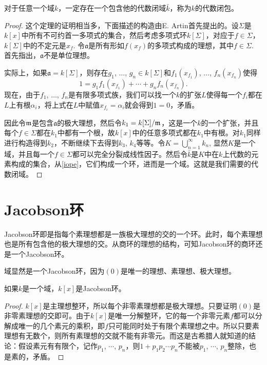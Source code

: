 \begin{thm}
对于任意一个域$k$，一定存在一个包含他的代数闭域$\bar{k}$，称为$k$的代数闭包。
\end{thm}

\begin{proof}
	这个定理的证明相当多，下面描述的构造由E. Artin首先提出的。设$\Sigma$是$k[x]$中所有不可约首一多项式的集合，然后考虑多项式环$k[\Sigma]$，对应于$f\in\Sigma$，$k[\Sigma]$中的不定元是$x_f$. 令$\mathfrak{a}$是所有形如$f(x_f)$的多项式构成的理想，其中$f\in\Sigma$. 首先指出，$\mathfrak{a}$不是单位理想。

	实际上，如果$\mathfrak{a}=k[\Sigma]$，则存在$g_1$, $\dots$, $g_n\in k[\Sigma]$和$f_1(x_{f_1})$, $\dots$, $f_n(x_{f_n})$使得
	\[
	1=g_1f_1(x_{f_1})+\cdots +g_nf_n(x_{f_n}).
	\]
	现在，由于$f_1$, $\dots$, $f_n$是有限多项式族，我们可以找一个$k$的扩张$L$使得每一个$f_i$都在$L$上有根$\alpha_i$，将上式在$L$中赋值$x_{f_i}=\alpha_i$就会得到$1=0$，矛盾。

	因此令$\mathfrak{m}$是包含$\mathfrak{a}$的极大理想，然后令$k_1=k[\Sigma]/\mathfrak{m}$，这是一个$k$的一个扩张，并且每个$f\in \Sigma$都在$k_1$中都有一个根，故$k[x]$中的任意多项式都在$k_1$中有根。对$k_1$同样进行构造得到$k_2$，不断继续下去得到$k_3$, $k_4$等等。令$K=\bigcup_{n=1}^\infty k_n$, 显然$K$是一个域，并且每一个$f\in \Sigma$都可以完全分裂成线性因子。然后令$\bar{k}$是$K$中在$k$上代数的元素构成的集合，从\ref{iope}，它们构成一个环，进而是一个域。这就是我们需要的代数闭域。
\end{proof}

\section{Jacobson环}

\begin{para}[Jacobson环]
	Jacobson环即是指每个素理想都是一族极大理想的交的一个环。此时，每个素理想也是所有包含他的极大理想的交。从商环的理想的结构，可知Jacobson环的商环还是一个Jacobson环。
\end{para}

域显然是一个Jacobson环，因为$(0)$是唯一的理想、素理想、极大理想。

\begin{lem}
	如果$k$是一个域，$k[x]$是Jacobson环。
\end{lem}

\begin{proof}
	$k[x]$是主理想整环，所以每个非零素理想都是极大理想。只要证明$(0)$是非零素理想的交即可。由于$k[x]$是唯一分解整环，它的每一个非零元素$f$都可以分解成唯一的几个素元的乘积，即$f$只可能同时处于有限个素理想之中。所以只要素理想有无数个，则所有素理想的交就不能有非零元。而这是古希腊人就知道的结论：假设素元有有限个，记作$p_1$, $\cdots$, $p_n$，则$1+p_1p_2\cdots p_n$不能被$p_1$, $\cdots$, $p_n$整除，也是素的，矛盾。
\end{proof}

